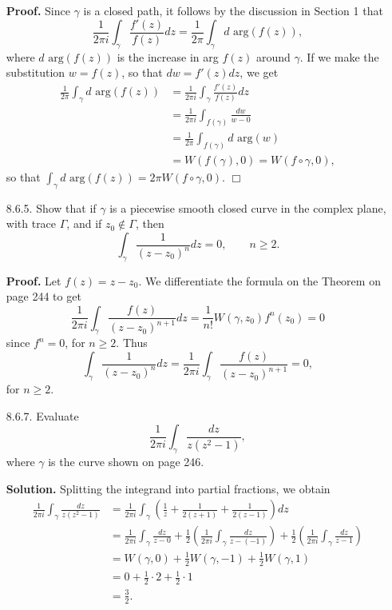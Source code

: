 \documentclass[9pt]{article}
\newcommand{\qed}{\hfill \ensuremath{\Box}}
\begin{document}
\begin{enumerate}
      \textbf{Proof.} Since $\gamma$ is a closed path, it follows by the
      discussion in Section 1 that
      $$\frac{1}{2\pi i}\int_\gamma\frac{f'(z)}{f(z)}dz =
        \frac{1}{2\pi}\int_\gamma d\text{ arg}(f(z)),$$
      where $d\text{ arg}(f(z))$ is the increase in arg $f(z)$ around $\gamma$.
      If we make the substitution $w = f(z)$, so that $dw = f'(z)dz$, we get
      \begin{align*}
         \frac{1}{2\pi}\int_\gamma d\text{ arg}(f(z)) &=
            \frac{1}{2\pi i}\int_\gamma\frac{f'(z)}{f(z)}dz \\
            &= \frac{1}{2\pi i}\int_{f(\gamma)}\frac{dw}{w - 0} \\
            &= \frac{1}{2\pi}\int_{f(\gamma)}d \text{ arg}(w) \\
            &= W(f(\gamma), 0) = W(f \circ \gamma, 0),
      \end{align*}
      so that $\int_\gamma d\text{ arg}(f(z)) = 2\pi W(f \circ\gamma, 0)$. \qed
   \item[8.6.5.]  Show that if $\gamma$ is a piecewise smooth closed curve in
                  the complex plane, with trace $\Gamma$, and if
                  $z_0 \notin \Gamma$, then
                  $$\int_\gamma\frac{1}{(z-z_0)^n}dz = 0,\qquad n \ge 2.$$
                  
      \textbf{Proof.} Let $f(z) = z - z_0$. We differentiate the formula on the Theorem on page 244
      to get
      $$\frac{1}{2\pi i }\int_\gamma\frac{f(z)}{(z-z_0)^{n+1}}dz = \frac{1}{n!}
      W(\gamma, z_0)f^{n}(z_0) = 0$$
      since $f^n = 0$, for $n \ge 2$. Thus
      $$\int_\gamma\frac{1}{(z-z_0)^n}dz = \frac{1}{2\pi i }\int_\gamma\frac{f(z)}{(z-z_0)^{n+1}} = 0,$$
      for $n \ge 2$.
   \item[8.6.7.]  Evaluate
                  $$\frac{1}{2\pi i}\int_\gamma \frac{dz}{z(z^2-1)},$$
                  where $\gamma$ is the curve shown on page 246.
                 
      \textbf{Solution.} Splitting the integrand into partial fractions, we
      obtain
      \begin{align*}
         \frac{1}{2\pi i}\int_\gamma \frac{dz}{z(z^2-1)} &=
            \frac{1}{2\pi i}\int_\gamma\left(\frac{1}{z} + \frac{1}{2(z+1)} +
            \frac{1}{2(z-1)}\right)dz \\
            &= \frac{1}{2\pi i}\int_\gamma \frac{dz}{z-0} +
               \frac{1}{2}\left(\frac{1}{2\pi i}
               \int_\gamma \frac{dz}{z-(-1)}\right) +               
               \frac{1}{2}\left(\frac{1}{2\pi i}
               \int_\gamma \frac{dz}{z-1}\right) \\
            &= W(\gamma, 0) + \frac{1}{2}W(\gamma, -1)+\frac{1}{2}W(\gamma, 1)\\
            &= 0 + \frac{1}{2} \cdot 2 + \frac{1}{2} \cdot 1 \\
            &= \frac{3}{2}.
      \end{align*}
\end{enumerate}
\end{document}
